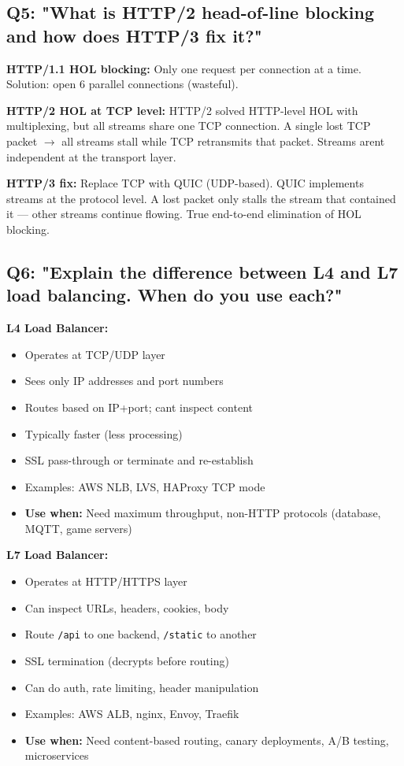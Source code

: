 \documentclass[11pt]{article}
\providecommand{\tightlist}{\setlength{\itemsep}{1pt}\setlength{\parskip}{0pt}}
\begin{document}
\subsection{Q5: "What is HTTP/2 head-of-line blocking and how does HTTP/3 fix it?"}\label{q5-what-is-http2-head-of-line-blocking-and-how-does-http3-fix-it}

\textbf{HTTP/1.1 HOL blocking:} Only one request per connection at a time. Solution: open 6 parallel connections (wasteful).

\textbf{HTTP/2 HOL at TCP level:} HTTP/2 solved HTTP-level HOL with multiplexing, but all streams share one TCP connection. A single lost TCP packet \(\rightarrow\) all streams stall while TCP retransmits that packet. Streams aren\textquotesingle t independent at the transport layer.

\textbf{HTTP/3 fix:} Replace TCP with QUIC (UDP-based). QUIC implements streams at the protocol level. A lost packet only stalls the stream that contained it --- other streams continue flowing. True end-to-end elimination of HOL blocking.

\subsection{Q6: "Explain the difference between L4 and L7 load balancing. When do you use each?"}\label{q6-explain-the-difference-between-l4-and-l7-load-balancing-when-do-you-use-each}

\textbf{L4 Load Balancer:}

\begin{itemize}
\tightlist
\item
  Operates at TCP/UDP layer
\item
  Sees only IP addresses and port numbers
\item
  Routes based on IP+port; can\textquotesingle t inspect content
\item
  Typically faster (less processing)
\item
  SSL pass-through or terminate and re-establish
\item
  Examples: AWS NLB, LVS, HAProxy TCP mode
\item
  \textbf{Use when:} Need maximum throughput, non-HTTP protocols (database, MQTT, game servers)
\end{itemize}

\textbf{L7 Load Balancer:}

\begin{itemize}
\tightlist
\item
  Operates at HTTP/HTTPS layer
\item
  Can inspect URLs, headers, cookies, body
\item
  Route \texttt{/api} to one backend, \texttt{/static} to another
\item
  SSL termination (decrypts before routing)
\item
  Can do auth, rate limiting, header manipulation
\item
  Examples: AWS ALB, nginx, Envoy, Traefik
\item
  \textbf{Use when:} Need content-based routing, canary deployments, A/B testing, microservices
\end{itemize}
\end{document}
